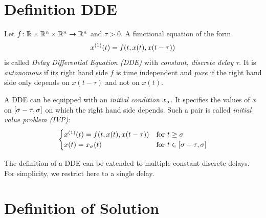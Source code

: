 \section{Definition DDE}
    \label{sec:definition-dde}

    \begin{definition}\label{def:dde}
        Let $f\colon\mathbb{R}\times\mathbb{R}^n\times\mathbb{R}^n\to\mathbb{R}^n$ and $\tau > 0$.
        A functional equation of the form
        \begin{equation}\label{eq:dde}
            \D{x}(t) = f(t,x(t),x(t-\tau))
        \end{equation}
        is called \emph{Delay Differential Equation (DDE)} with \emph{constant, discrete delay $\tau$}.
        It is \emph{autonomous} if its right hand side $f$ is time independent and \emph{pure} if the right hand side only depends on $x(t-\tau)$ and not on $x(t)$.

        A DDE can be equipped with an \emph{initial condition} $x_{\sigma}$. It specifies the values of $x$ on $[\sigma-\tau, \sigma]$ on which the right hand side depends.
        Such a pair is called \emph{initial value problem (IVP)}:
        \begin{equation}\label{eq:ivp}
            \begin{cases}
                \D{x}(t) = f(t,x(t),x(t-\tau)) & \text{for } t\geq\tzero\\
                x(t) = x_{\tzero}(t) & \text{for } t\in [\tzero-\tau,\tzero]
            \end{cases}
        \end{equation}
    \end{definition}


    The definition of a DDE can be extended to multiple constant discrete delays. For simplicity, we restrict here to a single delay.


\section{Definition of Solution}
    \label{sec:definition-of-solution}

